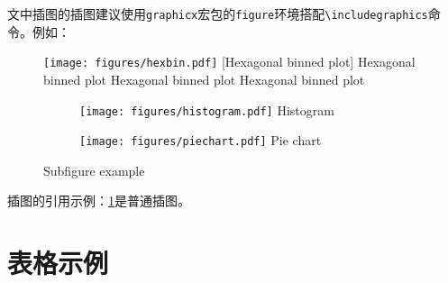 文中插图的插图建议使用\texttt{graphicx}宏包的\texttt{figure}环境搭配\texttt{\textbackslash includegraphics}命令。例如：
\begin{figure}[htbp]
	\centering
	\texttt{[image: figures/hexbin.pdf]}
	[Hexagonal binned plot]
    {Hexagonal binned plot Hexagonal binned plot Hexagonal binned plot}
	\label{fig:hexbin}
\end{figure}
\begin{figure}[htbp]
	\centering
    \begin{subfigure}{0.45\textwidth}
        \centering
	    \texttt{[image: figures/histogram.pdf]}
        {Histogram}
    \end{subfigure}
    \begin{subfigure}{0.45\textwidth}
        \centering
	    \texttt{[image: figures/piechart.pdf]}
        {Pie chart}
    \end{subfigure}
    {Subfigure example}
    \label{fig:subfig}
\end{figure}

插图的引用示例：\ref{fig:hexbin}是普通插图。

\section{表格示例}


